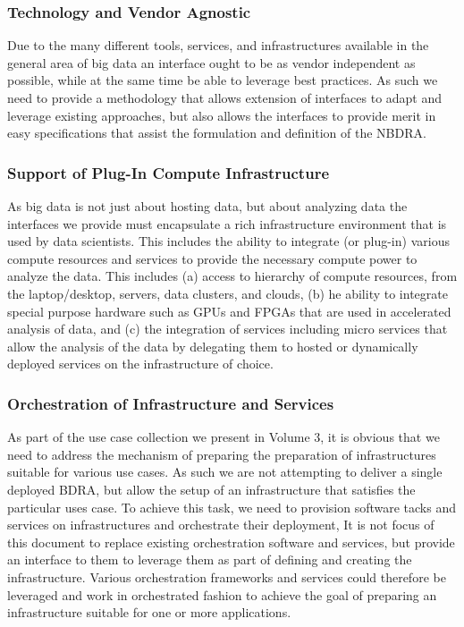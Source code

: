 \documentclass[10pt]{article}
\begin{document}
\subsubsection{Technology and Vendor Agnostic}

Due to the many different tools, services, and infrastructures available in the general area of big data an interface ought to be as vendor independent as possible, while at the same time be able to leverage best practices. As such we need to provide a methodology that allows extension of interfaces to adapt and leverage existing approaches, but also allows the interfaces to provide merit in easy specifications that assist the formulation and definition of the NBDRA. 

\subsubsection{Support of Plug-In Compute Infrastructure}

As big data is not just about hosting data, but about analyzing data the interfaces we provide must encapsulate a rich infrastructure environment that is used by data scientists. This includes the ability to integrate (or plug-in) various compute resources and services to provide the necessary compute power to analyze the data. This includes (a) access to hierarchy of compute resources, from the laptop/desktop, servers, data clusters, and clouds, (b) he ability to integrate special purpose hardware such as GPUs and FPGAs that are used in accelerated analysis of data, and (c) the integration of services including micro services that allow the analysis of the data by delegating them to hosted or dynamically deployed services on the infrastructure of choice.

\subsubsection{Orchestration of Infrastructure and Services}

As part of the use case collection we present in Volume 3, it is obvious that we need to address the mechanism of preparing the preparation of infrastructures suitable for various use cases. As such we are not attempting to deliver a single deployed BDRA, but allow the setup of an infrastructure that satisfies the particular uses case. To achieve this task, we need to provision software tacks and services on infrastructures and orchestrate their deployment, It is not focus of this document to replace existing orchestration software and services, but provide an interface to them to leverage them as part of defining and creating the infrastructure. Various orchestration frameworks and services could therefore be leveraged and work in orchestrated fashion to achieve the goal of preparing an infrastructure suitable for one or more applications.
\end{document}
